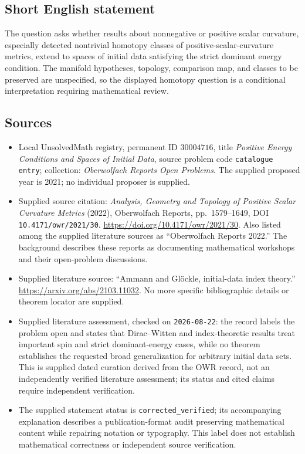 \documentclass[11pt]{article}
\begin{document}
\subsection{Short English statement}
The question asks whether results about nonnegative or positive scalar curvature, especially detected nontrivial homotopy classes of positive-scalar-curvature metrics, extend to spaces of initial data satisfying the strict dominant energy condition. The manifold hypotheses, topology, comparison map, and classes to be preserved are unspecified, so the displayed homotopy question is a conditional interpretation requiring mathematical review.
\subsection{Sources}
\begin{itemize}
\item Local UnsolvedMath registry, permanent ID \(30004716\), title \emph{Positive Energy Conditions and Spaces of Initial Data}, source problem code \texttt{catalogue entry}; collection: \emph{Oberwolfach Reports Open Problems}. The supplied proposed year is 2021; no individual proposer is supplied.
\item Supplied source citation: \emph{Analysis, Geometry and Topology of Positive Scalar Curvature Metrics} (2022), Oberwolfach Reports, pp.\ 1579--1649, DOI \texttt{10.4171/owr/2021/30}. \url{https://doi.org/10.4171/owr/2021/30}. Also listed among the supplied literature sources as ``Oberwolfach Reports 2022.'' The background describes these reports as documenting mathematical workshops and their open-problem discussions.
\item Supplied literature source: ``Ammann and Gl\"ockle, initial-data index theory.'' \url{https://arxiv.org/abs/2103.11032}. No more specific bibliographic details or theorem locator are supplied.
\item Supplied literature assessment, checked on \texttt{2026-08-22}: the record labels the problem open and states that Dirac--Witten and index-theoretic results treat important spin and strict dominant-energy cases, while no theorem establishes the requested broad generalization for arbitrary initial data sets. This is supplied dated curation derived from the OWR record, not an independently verified literature assessment; its status and cited claims require independent verification.
\item The supplied statement status is \texttt{corrected\_verified}; its accompanying explanation describes a publication-format audit preserving mathematical content while repairing notation or typography. This label does not establish mathematical correctness or independent source verification.
\end{itemize}
\end{document}
